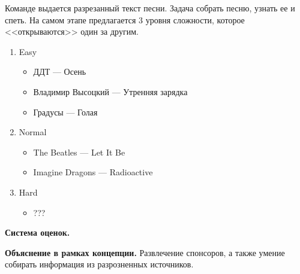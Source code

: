 
\par Команде выдается разрезанный текст песни. Задача собрать песню, узнать ее и спеть. На самом этапе предлагается 3 уровня сложности, которое <<открываются>> один за другим.
\begin{enumerate}
\item Easy
	\begin{itemize}
	\item ДДТ --- Осень
	\item Владимир Высоцкий --- Утренняя зарядка
	\item Градусы --- Голая
	\end{itemize}
	
\item Normal
	\begin{itemize}
	\item The Beatles --- Let It Be
	\item Imagine Dragons --- Radioactive
	\end{itemize}
	
\item Hard
	\begin{itemize}
	\item ???
	\end{itemize}
\end{enumerate}

\par \textbf{Система оценок.}

\par \textbf{Объяснение в рамках концепции.} Развлечение спонсоров, а также умение собирать информация из разрозненных источников.